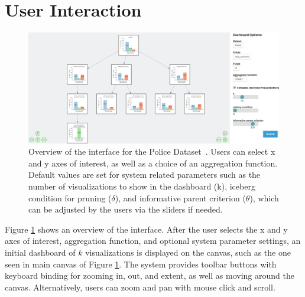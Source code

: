\section{User Interaction\label{sec:interaction}}
\begin{figure}[ht!]
\centering
\includegraphics[width=\linewidth]{figures/overview.jpeg}
\caption{Overview of the \system interface for the Police Dataset~\cite{ctrp3}. Users can select x and y axes of interest, as well as a choice of an aggregation function. Default values are set for system related parameters such as the number of visualizations to show in the dashboard (k), iceberg condition for pruning ($\delta$), and informative parent criterion ($\theta$), which can be adjusted by the users via the sliders if needed.}
\label{fig:overview}
\end{figure}
\par Figure \ref{fig:overview} shows an overview of the \system interface. After the user selects the x and y axes of interest, aggregation function, and optional system parameter settings, an initial dashboard of $k$ visualizations is displayed on the canvas, such as the one seen in main canvas of Figure \ref{fig:overview}.  The system provides toolbar buttons with keyboard binding for zooming in, out, and extent, as well as moving around the canvas. Alternatively, users can zoom and pan with mouse click and scroll.


